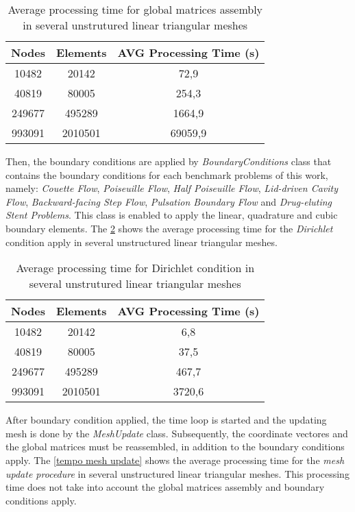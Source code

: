 \vspace{0.5cm}
\begin{table}[H]
\centering
\begin{tabular}{ccc}
\toprule
\textbf{Nodes} & \textbf{Elements} & \textbf{AVG Processing Time} (s) \\
\midrule
10482 & 20142 & 72,9 \\
40819 & 80005 & 254,3 \\
249677 & 495289 & 1664,9 \\
993091 & 2010501 & 69059,9 \\

\bottomrule
\end{tabular}
\caption{Average processing time for global matrices assembly in several unstrutured linear triangular meshes}
\label{tempo matrizes globais}
\end{table}


\medskip
Then, the boundary conditions are applied by \textit{BoundaryConditions} class
that contains the boundary conditions
for each benchmark problems of this
work, namely:
\textit{Couette Flow}, 
\textit{Poiseuille Flow}, 
\textit{Half Poiseuille Flow}, 
\textit{Lid-driven Cavity Flow}, 
\textit{Backward-facing Step Flow}, 
\textit{Pulsation Boundary Flow} and
\textit{Drug-eluting Stent Problems}. 
This class is enabled to apply 
the linear, quadrature and cubic boundary elements.
The \ref{tempo contorno} 
shows the average processing time for the \textit{Dirichlet} 
condition apply in several unstructured linear triangular meshes.

\vspace{0.5cm}
\begin{table}[H]
\centering
\begin{tabular}{ccc}
\toprule
\textbf{Nodes} & \textbf{Elements} & \textbf{AVG Processing Time} (s) \\
\midrule
10482 & 20142 & 6,8 \\
40819 & 80005 & 37,5 \\
249677 & 495289 & 467,7 \\
993091 & 2010501 & 3720,6 \\
\bottomrule
\end{tabular}
\caption{Average processing time for Dirichlet condition in several unstrutured linear triangular meshes}
\label{tempo contorno}
\end{table}
 
\medskip
After boundary condition applied, the time loop is started and
the updating mesh is done by the \textit{MeshUpdate} class.
Subsequently, the coordinate vectores and the global matrices
must be reassembled, in addition to the boundary conditions apply.
The \ref{tempo mesh update} 
shows the average processing time for the \textit{mesh update procedure}
in several unstructured linear triangular meshes.
This processing time does not take into account the global matrices assembly and
boundary conditions apply.

